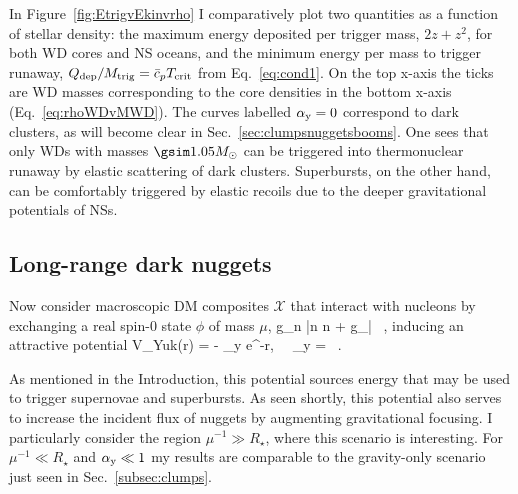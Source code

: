 \documentclass[
    twocolumn,
	prd,
        amssymb,
	preprintnumbers,
	secnumarabic,
	nofootinbib,
	superscriptaddress]{revtex4-1}
\begin{document}
In Figure~\ref{fig:EtrigvEkinvrho} I comparatively plot two quantities as a function of stellar density: the maximum energy deposited per trigger mass, $2 z + z^2$, for both WD cores and NS oceans, and the minimum energy per mass to trigger runaway, $Q_{\rm dep}/M_{\rm trig} = \bar c_p T_{\rm crit}$ from Eq.~\eqref{eq:cond1}.  
On the top x-axis the ticks are WD masses corresponding to the core densities in the bottom x-axis (Eq.~\eqref{eq:rhoWDvMWD}).
The curves labelled $\alpha_{\rm y} = 0$ correspond to dark clusters, as will become clear in Sec.~\ref{sec:clumpsnuggetsbooms}.
One sees that only WDs with masses $\gsim 1.05 M_\odot$ can be triggered into thermonuclear runaway by elastic scattering of dark clusters.
Superbursts, on the other hand, can be comfortably triggered by elastic recoils due to the deeper gravitational potentials of NSs.


 \subsection{Long-range dark nuggets}
 \label{subsec:nuggets}

Now consider macroscopic DM composites $\mathcal{X}$ that interact with nucleons by exchanging a real spin-0 state $\phi$ of mass $\mu$, 
\beq
{} \supset g_n \phi \bar n n + g_\chi \phi \bar{} ~,
\label{eq:Lag}
\eeq
inducing an attractive potential
\beq
V_{\rm Yuk}(r) =  - \alpha_{\rm y}  e^{-\mu r}, \ \  \alpha_{\rm y}  = ~.
\label{eq:VYuk}
\eeq

As mentioned in the Introduction, this potential sources energy that may be used to trigger supernovae and superbursts.
As seen shortly, this potential also serves to increase the incident flux of nuggets by augmenting gravitational focusing.
I particularly consider the region $\mu^{-1} \gg R_\star$, where this scenario is interesting. 
For $\mu^{-1} \ll R_\star$ and $\alpha_{\rm y} \ll 1$ my results are comparable to the gravity-only scenario just seen in Sec.~\ref{subsec:clumps}. 
\end{document}

